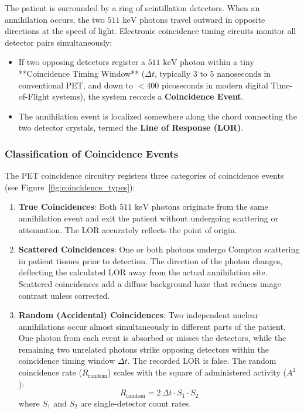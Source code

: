 \documentclass[11pt,a4paper]{article}
\begin{document}
The patient is surrounded by a ring of scintillation detectors. When an annihilation occurs, the two $511\text{ keV}$ photons travel outward in opposite directions at the speed of light. Electronic coincidence timing circuits monitor all detector pairs simultaneously:
\begin{itemize}
    \item If two opposing detectors register a $511\text{ keV}$ photon within a tiny **Coincidence Timing Window** ($\Delta t$, typically $3\text{ to }5\text{ nanoseconds}$ in conventional PET, and down to $<400\text{ picoseconds}$ in modern digital Time-of-Flight systems), the system records a \textbf{Coincidence Event}.
    \item The annihilation event is localized somewhere along the chord connecting the two detector crystals, termed the \textbf{Line of Response (LOR)}.
\end{itemize}

\subsubsection{Classification of Coincidence Events}
The PET coincidence circuitry registers three categories of coincidence events (see Figure~\ref{fig:coincidence_types}):
\begin{enumerate}
    \item \textbf{True Coincidences}: Both $511\text{ keV}$ photons originate from the same annihilation event and exit the patient without undergoing scattering or attenuation. The LOR accurately reflects the point of origin.
    \item \textbf{Scattered Coincidences}: One or both photons undergo Compton scattering in patient tissues prior to detection. The direction of the photon changes, deflecting the calculated LOR away from the actual annihilation site. Scattered coincidences add a diffuse background haze that reduces image contrast unless corrected.
    \item \textbf{Random (Accidental) Coincidences}: Two independent nuclear annihilations occur almost simultaneously in different parts of the patient. One photon from each event is absorbed or misses the detectors, while the remaining two unrelated photons strike opposing detectors within the coincidence timing window $\Delta t$. The recorded LOR is false. The random coincidence rate ($R_{\text{random}}$) scales with the square of administered activity ($A^2$):
    \begin{equation}
        R_{\text{random}} = 2 \, \Delta t \cdot S_1 \cdot S_2
    \end{equation}
    where $S_1$ and $S_2$ are single-detector count rates.
\end{enumerate}
\end{document}
